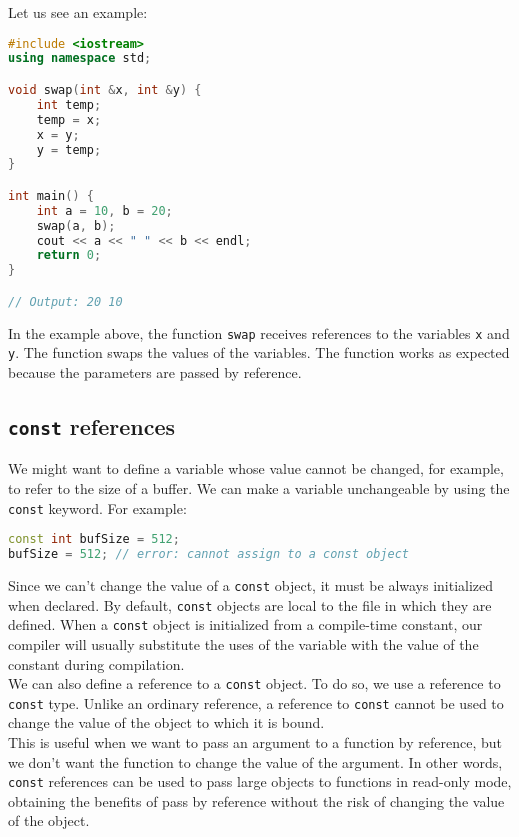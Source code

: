Let us see an example:\\

\begin{lstlisting}[language=C++]
#include <iostream>
using namespace std;

void swap(int &x, int &y) {
    int temp;
    temp = x;
    x = y;
    y = temp;
}

int main() {
    int a = 10, b = 20;
    swap(a, b);
    cout << a << " " << b << endl;
    return 0;
}

// Output: 20 10
\end{lstlisting}

In the example above, the function \texttt{swap} receives references to the
variables \texttt{x} and \texttt{y}. The function swaps the values of the
variables. The function works as expected because the parameters are passed by
reference.\\

\subsection{\texttt{const} references}

We might want to define a variable whose value cannot be changed, for example,
to refer to the size of a buffer. We can make a variable unchangeable by using
the \texttt{const} keyword. For example:\\

\begin{lstlisting}[language=C++]
const int bufSize = 512;
bufSize = 512; // error: cannot assign to a const object
\end{lstlisting}

Since we can't change the value of a \texttt{const} object, it must be always
initialized when declared. By default, \texttt{const} objects are local to the
file in which they are defined. When a \texttt{const} object is initialized from 
a compile-time constant, our compiler will usually substitute the uses of the 
variable with the value of the constant during compilation.\\

We can also define a reference to a \texttt{const} object. To do so, we use a 
reference to \texttt{const} type. Unlike an ordinary reference, a reference to
\texttt{const} cannot be used to change the value of the object to which it is
bound.\\

This is useful when we want to pass an argument to a function by reference, 
but we don't want the function to change the value of the argument. In other
words, \texttt{const} references can be used to pass large objects to functions
in read-only mode, obtaining the benefits of pass by reference without the risk
of changing the value of the object.\\

